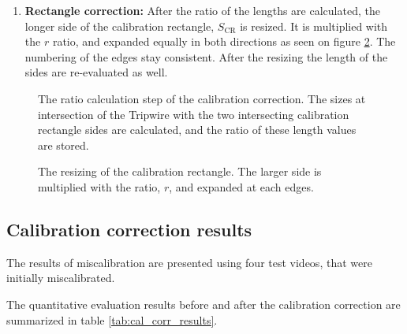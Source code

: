 \begin{enumerate}[align=parleft]
	with $fl(k_{\text{CR}}), fl(K_{\text{CR}})$ being the length values of the fitted line in the $k_{\text{CR}}$ and $K_{\text{CR}}$, intersection points of the Tripwire.
	These length values correspond to the average values of the lengths stored in the proper rows of the Size Timeline.
	 
	After, the ratio of these two lengths is calculated, quantifying the degree of miscalibration, $r$:
	\begin{displaymath}
		r = \frac{L}{l}.
	\end{displaymath}
	
	The notations used are illustrated in figure \ref{fig:ratio_calculation}.
	
	\item  \textbf{Rectangle correction:}
	After the ratio of the lengths are calculated, the longer side of the calibration rectangle, $S_{\text{CR}}$ is resized.
	It is multiplied with the $r$ ratio, and expanded equally in both directions as seen on figure \ref{fig:resizing_cr}. 
	The numbering of the edges stay consistent.
	After the resizing the length of the sides are re-evaluated as well.
\end{enumerate}

\begin{figure}[!h]
	\centering
	
	\caption{The ratio calculation step of the calibration correction. The sizes at intersection of the Tripwire with the two intersecting calibration rectangle sides are calculated, and the ratio of these length values are stored. \label{fig:ratio_calculation}}
\end{figure}

\begin{figure}[!h]
	\centering
	
	\caption{The resizing of the calibration rectangle. The larger side is multiplied with the ratio, $r$, and expanded at each edges. \label{fig:resizing_cr}}
\end{figure}

\subsection{Calibration correction results}
The results of miscalibration are presented using four test videos, that were initially miscalibrated.

The quantitative evaluation results before and after the calibration correction are summarized in table \ref{tab:cal_corr_results}.

